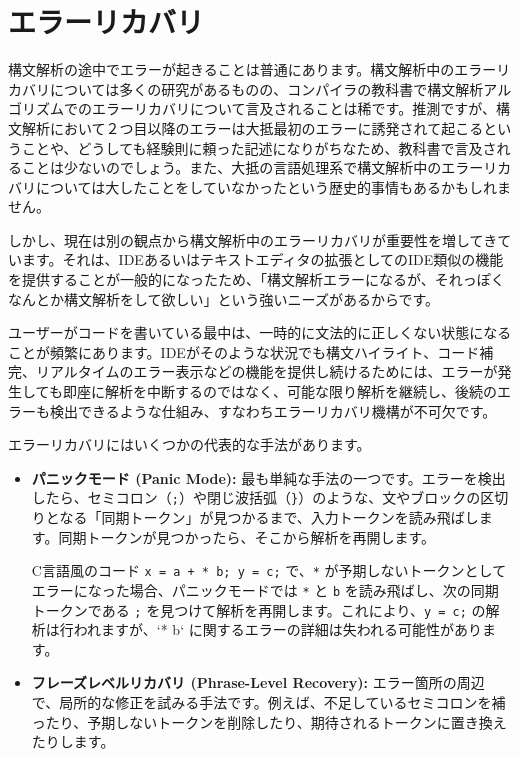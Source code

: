 \hypertarget{chapter7-ux30a8ux30e9ux30fcux30eaux30abux30d0ux30ea}{%
\section{エラーリカバリ}\label{chapter7-ux30a8ux30e9ux30fcux30eaux30abux30d0ux30ea}}

構文解析の途中でエラーが起きることは普通にあります。構文解析中のエラーリカバリについては多くの研究があるものの、コンパイラの教科書で構文解析アルゴリズムでのエラーリカバリについて言及されることは稀です。推測ですが、構文解析において２つ目以降のエラーは大抵最初のエラーに誘発されて起こるということや、どうしても経験則に頼った記述になりがちなため、教科書で言及されることは少ないのでしょう。また、大抵の言語処理系で構文解析中のエラーリカバリについては大したことをしていなかったという歴史的事情もあるかもしれません。

しかし、現在は別の観点から構文解析中のエラーリカバリが重要性を増してきています。それは、IDEあるいはテキストエディタの拡張としてのIDE類似の機能を提供することが一般的になったため、「構文解析エラーになるが、それっぽくなんとか構文解析をして欲しい」という強いニーズがあるからです。

ユーザーがコードを書いている最中は、一時的に文法的に正しくない状態になることが頻繁にあります。IDEがそのような状況でも構文ハイライト、コード補完、リアルタイムのエラー表示などの機能を提供し続けるためには、エラーが発生しても即座に解析を中断するのではなく、可能な限り解析を継続し、後続のエラーも検出できるような仕組み、すなわちエラーリカバリ機構が不可欠です。

エラーリカバリにはいくつかの代表的な手法があります。

\begin{itemize}
\item
  \textbf{パニックモード (Panic Mode):}
  最も単純な手法の一つです。エラーを検出したら、セミコロン（\texttt{;}）や閉じ波括弧（\texttt{\}}）のような、文やブロックの区切りとなる「同期トークン」が見つかるまで、入力トークンを読み飛ばします。同期トークンが見つかったら、そこから解析を再開します。

  C言語風のコード \texttt{x\ =\ a\ +\ *\ b;\ y\ =\ c;} で、\texttt{*}
  が予期しないトークンとしてエラーになった場合、パニックモードでは
  \texttt{*} と \texttt{b} を読み飛ばし、次の同期トークンである
  \texttt{;} を見つけて解析を再開します。これにより、\texttt{y\ =\ c;}
  の解析は行われますが、`* b`
  に関するエラーの詳細は失われる可能性があります。
\item
  \textbf{フレーズレベルリカバリ (Phrase-Level Recovery):}
  エラー箇所の周辺で、局所的な修正を試みる手法です。例えば、不足しているセミコロンを補ったり、予期しないトークンを削除したり、期待されるトークンに置き換えたりします。
\end{itemize}

